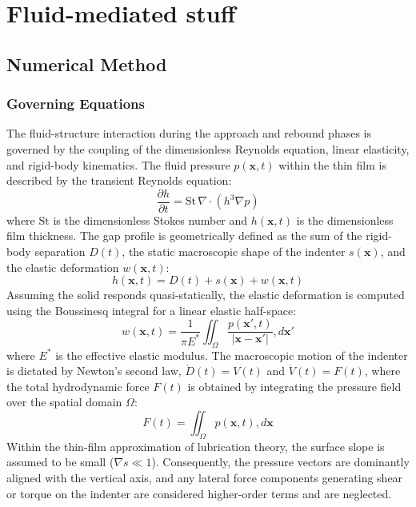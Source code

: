 \chapter{Fluid-mediated stuff}

\section{Numerical Method}
\subsection{Governing Equations}

The fluid-structure interaction during the approach and rebound phases is governed by the coupling of the dimensionless Reynolds equation, linear elasticity, and rigid-body kinematics. 
The fluid pressure $p(\boldsymbol{x}, t)$ within the thin film is described by the transient Reynolds equation:
\begin{equation}
    \frac{\partial h}{\partial t} = \text{St} \, \nabla \cdot \left( h^3 \nabla p \right)
\end{equation}
where $\text{St}$ is the dimensionless Stokes number and $h(\boldsymbol{x}, t)$ is the dimensionless film thickness.
The gap profile is geometrically defined as the sum of the rigid-body separation $D(t)$, the static macroscopic shape of the indenter $s(\boldsymbol{x})$, and the elastic deformation $w(\boldsymbol{x}, t)$:
\begin{equation}
    h(\boldsymbol{x}, t) = D(t) + s(\boldsymbol{x}) + w(\boldsymbol{x}, t)
\end{equation}
Assuming the solid responds quasi-statically, the elastic deformation is computed using the Boussinesq integral for a linear elastic half-space:
\begin{equation}
    w(\boldsymbol{x}, t) = \frac{1}{\pi E^*} \iint_{\Omega} \frac{p(\boldsymbol{x}', t)}{|\boldsymbol{x} - \boldsymbol{x}'|} , d\boldsymbol{x}'
\end{equation}
where $E^*$ is the effective elastic modulus.
The macroscopic motion of the indenter is dictated by Newton's second law, $\dot{D}(t) = V(t)$ and $\dot{V}(t) = F(t)$, where the total hydrodynamic force $F(t)$ is obtained by integrating the pressure field over the spatial domain $\Omega$:
\begin{equation}
    F(t) = \iint_{\Omega} p(\boldsymbol{x}, t) , d\boldsymbol{x}
\end{equation}
Within the thin-film approximation of lubrication theory, the surface slope is assumed to be small ($\nabla s \ll 1$). 
Consequently, the pressure vectors are dominantly aligned with the vertical axis, and any lateral force components generating shear or torque on the indenter are considered higher-order terms and are neglected.

